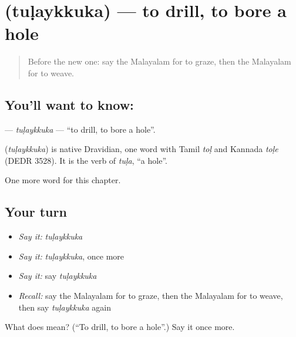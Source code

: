 \section[\texorpdfstring{\ml{തുളയ്ക്കുക} (tuḷaykkuka)}{തുളയ്ക്കുക (tuḷaykkuka)}]{ (tuḷaykkuka) — to drill, to bore a hole}

\label{lesson:ML-C272-tulaykkuka}



\begin{quote}
Before the new one: say the Malayalam for to graze, then the Malayalam for to weave.
\end{quote}

\subsection*{You'll want to know: }
\textbf{} — \emph{tuḷaykkuka} — \textquotedblleft{}to drill, to bore a hole\textquotedblright{}.

\begin{cousinweb}
\textbf{} (\emph{tuḷaykkuka}) is native Dravidian, one word with Tamil \emph{toḷ} and Kannada \emph{toḷe} (DEDR 3528). It is the verb of \emph{tuḷa}, \textquotedblleft{}a hole\textquotedblright{}.
\end{cousinweb}

\begin{grammarlens}[title={What you've built}]
One more word for this chapter.
\end{grammarlens}

\subsection*{Your turn}
\begin{itemize}
\raggedright
  \item \emph{Say it:} \emph{tuḷaykkuka}
  \item \emph{Say it:} \emph{tuḷaykkuka}, once more
  \item \emph{Say it:} say \emph{tuḷaykkuka}
  \item \emph{Recall:} say the Malayalam for to graze, then the Malayalam for to weave, then say \emph{tuḷaykkuka} again
\end{itemize}

\begin{tcolorbox}[breakable,colback=teal!4,colframe=teal!35!black,title={Before you move on}]
What does  mean? (\textquotedblleft{}To drill, to bore a hole\textquotedblright{}.) Say it once more.
\end{tcolorbox}
